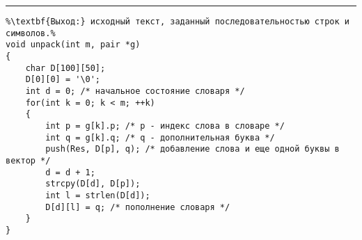 \documentclass{article}
\begin{document}
\vspace{5pt} \hrule
\begin{lstlisting}[caption={Распаковка по методу Лемпела - Зива}, label=p230_2, escapechar=\%]
%\noindent\textbf{Вход:} сжатый текст, представленный массивом пар g: \textbf{array} [1..m] \textbf{of record} p: \textbf{int}; q: \textbf{char end record}, где p - номер слова в словаре, q - код дополняющей буквы.\\%
%\textbf{Выход:} исходный текст, заданный последовательностью строк и символов.%
void unpack(int m, pair *g)
{
	char D[100][50];
	D[0][0] = '\0';
	int d = 0; /* начальное состояние словаря */
	for(int k = 0; k < m; ++k)
	{
		int p = g[k].p; /* p - индекс слова в словаре */
		int q = g[k].q; /* q - дополнительная буква */
		push(Res, D[p], q); /* добавление слова и еще одной буквы в вектор */
		d = d + 1;
		strcpy(D[d], D[p]);
		int l = strlen(D[d]);
		D[d][l] = q; /* пополнение словаря */
	}
}
\end{lstlisting}
\end{document}
